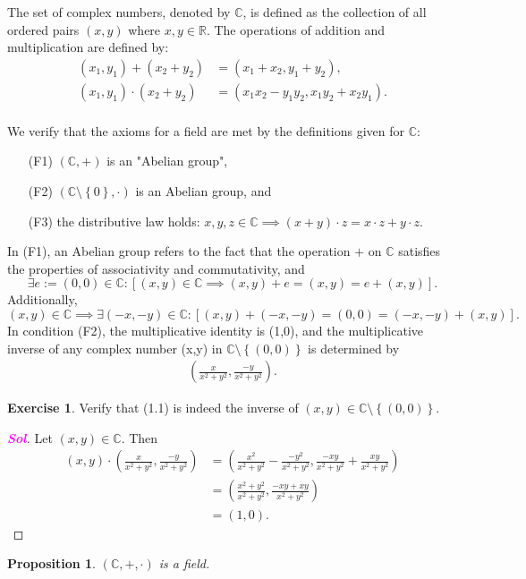\documentclass[12pt,openany]{book}
\newtheorem{proposition}[theorem]{Proposition}
\theoremstyle{definition}
\newtheorem{exercise}{Exercise}[section]
\newcommand{\set}[1]{\left\{#1\right\}}
\newcommand{\R}{\mathbb{R}}
\newcommand{\C}{\mathbb{C}}
\newcommand{\of}[1]{\left( #1 \right)}
\newcommand{\sol}{\textcolor{magenta}{\bf Sol}}
\begin{document}
	The set of complex numbers, denoted by $\C$, is defined as the collection of all ordered pairs $(x,y)$ where $x,y\in\R$. The operations of addition and multiplication are defined by:\begin{align*}
		(x_1,y_1)+(x_2+y_2)&=(x_1+x_2,y_1+y_2),\\
		(x_1,y_1)\cdot(x_2+y_2)&=(x_1x_2-y_1y_2,x_1y_2+x_2y_1).\\
	\end{align*}
	
	We verify that the axioms for a field are met by the definitions given for $\C$: \begin{itemize}
		\item[(F1)] $\of{\C,+}$ is an "Abelian group",
		\item[(F2)] $\of{\C\setminus\set{0},\cdot}$ is an Abelian group, and
		\item[(F3)] the distributive law holds: $x,y,z\in\C\implies\of{x+y}\cdot z=x\cdot z+y\cdot z$.
	\end{itemize}
	
	In (F1), an Abelian group refers to the fact that the operation $+$ on $\C$ satisfies the properties of associativity and commutativity, and \[
	\exists e:=(0,0)\in\C:[(x,y)\in\C\implies(x,y)+e=(x,y)=e+(x,y)].
	\] Additionally, \[
	(x,y)\in\C\implies\exists(-x,-y)\in\C:[(x,y)+(-x,-y)=(0,0)=(-x,-y)+(x,y)].
	\] In condition (F2), the multiplicative identity is (1,0), and the multiplicative inverse of any complex number (x,y) in $\C\setminus\set{(0,0)}$ is determined by \begin{align}
		\of{\frac{x}{x^2+y^2},\frac{-y}{x^2+y^2}}.
	\end{align}
	
	\begin{exercise}
		Verify that (1.1) is indeed the inverse of $(x,y)\in\C\setminus\set{(0,0)}$.
		\begin{proof}[\sol]
			Let $(x,y)\in\C$. Then \begin{align*}
				(x,y)\cdot\of{\frac{x}{x^2+y^2},\frac{-y}{x^2+y^2}}
				&=\of{\frac{x^2}{x^2+y^2}-\frac{-y^2}{x^2+y^2},\frac{-xy}{x^2+y^2}+\frac{xy}{x^2+y^2}}\\
				&=\of{\frac{x^2+y^2}{x^2+y^2},\frac{-xy+xy}{x^2+y^2}}\\
				&=(1,0).
			\end{align*}
		\end{proof}
	\end{exercise}
	
	\begin{tcolorbox}[title=Complex Numbers are Field]
		\begin{proposition}
			$\of{\C,+,\cdot}$ is a field.
		\end{proposition}
	\end{tcolorbox}
	
\end{document}
